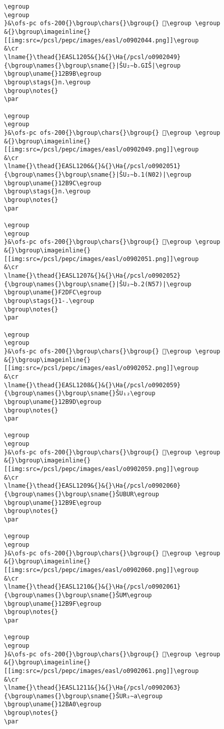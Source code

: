 \begin{verbatim}
\egroup
\egroup
}&\ofs-pc ofs-200{}\bgroup\chars{}\bgroup{} 𒮚\egroup \egroup
&{}\bgroup\imageinline{}[[img:src=/pcsl/pepc/images/easl/o0902044.png]]\egroup
&\cr
\lname{}\thead{}EASL1205&{}&{}\Ha{/pcsl/o0902049}{\bgroup\names{}\bgroup\sname{}|ŠU₂∼b.GIŠ|\egroup
\bgroup\uname{}12B9B\egroup
\bgroup\stags{}n.\egroup
\bgroup\notes{}
\par 

\egroup
\egroup
}&\ofs-pc ofs-200{}\bgroup\chars{}\bgroup{} 𒮛\egroup \egroup
&{}\bgroup\imageinline{}[[img:src=/pcsl/pepc/images/easl/o0902049.png]]\egroup
&\cr
\lname{}\thead{}EASL1206&{}&{}\Ha{/pcsl/o0902051}{\bgroup\names{}\bgroup\sname{}|ŠU₂∼b.1(N02)|\egroup
\bgroup\uname{}12B9C\egroup
\bgroup\stags{}n.\egroup
\bgroup\notes{}
\par 

\egroup
\egroup
}&\ofs-pc ofs-200{}\bgroup\chars{}\bgroup{} 𒮜\egroup \egroup
&{}\bgroup\imageinline{}[[img:src=/pcsl/pepc/images/easl/o0902051.png]]\egroup
&\cr
\lname{}\thead{}EASL1207&{}&{}\Ha{/pcsl/o0902052}{\bgroup\names{}\bgroup\sname{}|ŠU₂∼b.2(N57)|\egroup
\bgroup\uname{}F2DFC\egroup
\bgroup\stags{}1-.\egroup
\bgroup\notes{}
\par 

\egroup
\egroup
}&\ofs-pc ofs-200{}\bgroup\chars{}\bgroup{} 󲷼\egroup \egroup
&{}\bgroup\imageinline{}[[img:src=/pcsl/pepc/images/easl/o0902052.png]]\egroup
&\cr
\lname{}\thead{}EASL1208&{}&{}\Ha{/pcsl/o0902059}{\bgroup\names{}\bgroup\sname{}ŠU₁₂\egroup
\bgroup\uname{}12B9D\egroup
\bgroup\notes{}
\par 

\egroup
\egroup
}&\ofs-pc ofs-200{}\bgroup\chars{}\bgroup{} 𒮝\egroup \egroup
&{}\bgroup\imageinline{}[[img:src=/pcsl/pepc/images/easl/o0902059.png]]\egroup
&\cr
\lname{}\thead{}EASL1209&{}&{}\Ha{/pcsl/o0902060}{\bgroup\names{}\bgroup\sname{}ŠUBUR\egroup
\bgroup\uname{}12B9E\egroup
\bgroup\notes{}
\par 

\egroup
\egroup
}&\ofs-pc ofs-200{}\bgroup\chars{}\bgroup{} 𒮞\egroup \egroup
&{}\bgroup\imageinline{}[[img:src=/pcsl/pepc/images/easl/o0902060.png]]\egroup
&\cr
\lname{}\thead{}EASL1210&{}&{}\Ha{/pcsl/o0902061}{\bgroup\names{}\bgroup\sname{}ŠUM\egroup
\bgroup\uname{}12B9F\egroup
\bgroup\notes{}
\par 

\egroup
\egroup
}&\ofs-pc ofs-200{}\bgroup\chars{}\bgroup{} 𒮟\egroup \egroup
&{}\bgroup\imageinline{}[[img:src=/pcsl/pepc/images/easl/o0902061.png]]\egroup
&\cr
\lname{}\thead{}EASL1211&{}&{}\Ha{/pcsl/o0902063}{\bgroup\names{}\bgroup\sname{}ŠUR₂∼a\egroup
\bgroup\uname{}12BA0\egroup
\bgroup\notes{}
\par 


\end{verbatim}
